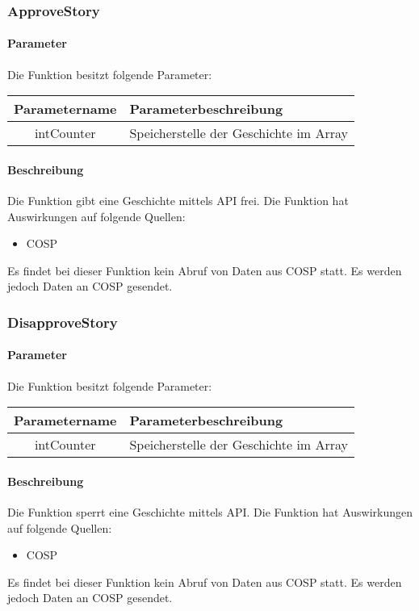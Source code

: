 \subsubsection{ApproveStory}
\paragraph{Parameter} Die Funktion besitzt folgende Parameter:
\begin{table}[H]
	\begin{tabular}{|c|p{11cm}|}
		\hline
		\textbf{Parametername} & \textbf{Parameterbeschreibung} \\ \hline
		intCounter & Speicherstelle der Geschichte im Array \\ \hline
	\end{tabular}
\end{table}
\paragraph{Beschreibung} Die Funktion gibt eine Geschichte mittels API frei. Die Funktion hat Auswirkungen auf folgende Quellen:
\begin{itemize}
	\item COSP
\end{itemize}
Es findet bei dieser Funktion kein Abruf von Daten aus {\glqq COSP\grqq} statt. Es werden jedoch Daten an {\glqq COSP\grqq} gesendet.
\subsubsection{DisapproveStory}
\paragraph{Parameter} Die Funktion besitzt folgende Parameter:
\begin{table}[H]
	\begin{tabular}{|c|p{11cm}|}
		\hline
		\textbf{Parametername} & \textbf{Parameterbeschreibung} \\ \hline
		intCounter & Speicherstelle der Geschichte im Array \\ \hline
	\end{tabular}
\end{table}
\paragraph{Beschreibung} Die Funktion sperrt eine Geschichte mittels API. Die Funktion hat Auswirkungen auf folgende Quellen:
\begin{itemize}
	\item COSP
\end{itemize}
Es findet bei dieser Funktion kein Abruf von Daten aus {\glqq COSP\grqq} statt. Es werden jedoch Daten an {\glqq COSP\grqq} gesendet.

